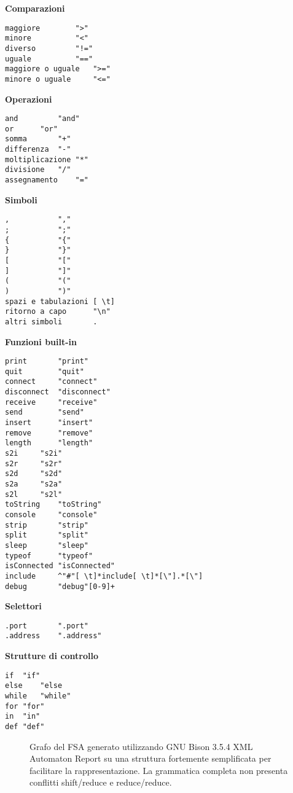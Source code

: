 \documentclass[10pt]{article}
\begin{document}
\textbf{Comparazioni}
\begin{lstlisting}[breaklines=true, postbreak=\mbox{{$\hookrightarrow$}\space}]
maggiore		">"
minore			"<"
diverso			"!="
uguale			"=="
maggiore o uguale	">="
minore o uguale		"<="
\end{lstlisting}

\textbf{Operazioni}
\begin{lstlisting}[breaklines=true, postbreak=\mbox{{$\hookrightarrow$}\space}]
and 		"and"
or		"or"
somma		"+"
differenza	"-"
moltiplicazione	"*"
divisione	"/"
assegnamento	"="
\end{lstlisting}

\textbf{Simboli}
\begin{lstlisting}[breaklines=true, postbreak=\mbox{{$\hookrightarrow$}\space}]
,			","
;			";"
{			"{"
}			"}"
[			"["
]			"]"
(			"("
)			")"
spazi e tabulazioni	[ \t]
ritorno a capo		"\n"
altri simboli		.
\end{lstlisting}


\textbf{Funzioni built-in}
\begin{lstlisting}[breaklines=true, postbreak=\mbox{{$\hookrightarrow$}\space}]
print		"print" 
quit		"quit"
connect		"connect"
disconnect	"disconnect"
receive		"receive"
send		"send"
insert		"insert"
remove		"remove"
length		"length"
s2i		"s2i"
s2r		"s2r"
s2d		"s2d"
s2a		"s2a"	
s2l		"s2l"
toString	"toString"
console		"console"
strip		"strip"
split		"split"
sleep		"sleep"
typeof		"typeof"
isConnected	"isConnected"
include		^"#"[ \t]*include[ \t]*[\"].*[\"]
debug		"debug"[0-9]+
\end{lstlisting}

\textbf{Selettori}
\begin{lstlisting}[breaklines=true, postbreak=\mbox{{$\hookrightarrow$}\space}]
.port		".port"
.address	".address"
\end{lstlisting}

\textbf{Strutture di controllo}
\begin{lstlisting}[breaklines=true, postbreak=\mbox{{$\hookrightarrow$}\space}]
if	"if"
else	"else
while	"while"
for	"for"
in	"in"
def	"def"
\end{lstlisting}

\begin{figure}[t]
	\centering
	\caption{Grafo del FSA generato utilizzando  GNU Bison 3.5.4 XML Automaton Report su una struttura fortemente semplificata per facilitare la rappresentazione. La grammatica completa non presenta conflitti shift/reduce e reduce/reduce.}
	\label{fig:parser_simple}
\end{figure}
\end{document}
